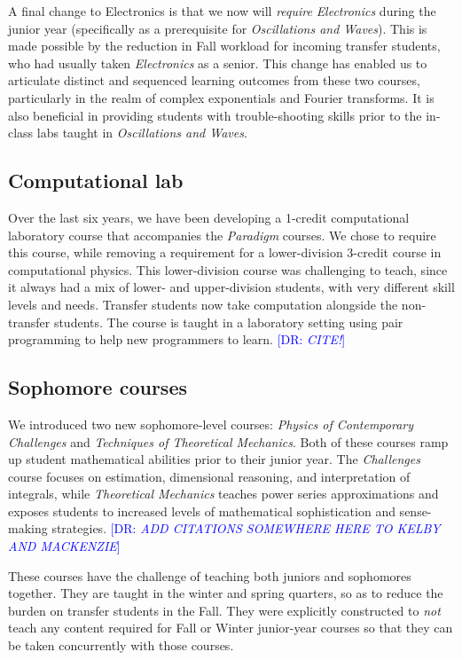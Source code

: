 \documentclass[english,aps,pra,reprint,noshowpacs,superscriptaddress]{revtex4-1}
\newcommand\davidsays[1]{\textcolor{blue}{[\sc DR: {\em#1}]}}
\begin{document}
A final change to Electronics is that we now will \emph{require}
\emph{Electronics} during the junior year (specifically as a prerequisite for
\emph{Oscillations and Waves}).  This is made possible by the reduction in
Fall workload for incoming transfer students, who had
usually taken \emph{Electronics} as a senior.  This change has enabled us to
articulate distinct and sequenced learning outcomes from these two
courses, particularly in the realm of complex exponentials and Fourier
transforms.  It is also beneficial in providing students with
trouble-shooting skills prior to the in-class labs taught in
\emph{Oscillations and Waves}.

\subsection{Computational lab}
Over the last six years, we have been developing a 1-credit
computational laboratory course that accompanies the \emph{Paradigm} courses.  We
chose to require this course, while removing a requirement for a
lower-division 3-credit course in computational physics.  This
lower-division course was challenging to teach, since it always had a
mix of lower- and upper-division students, with very different skill
levels and needs.  Transfer students now take computation alongside
the non-transfer students. The course is taught in a laboratory setting using pair
programming to help new programmers to learn. \davidsays{CITE!}

\subsection{Sophomore courses}
We introduced two new sophomore-level courses: \emph{Physics of
Contemporary Challenges} and \emph{Techniques of Theoretical Mechanics}.  Both of
these courses ramp up student mathematical abilities prior to their
junior year.  The \emph{Challenges} course focuses on estimation,
dimensional reasoning, and interpretation of integrals, while
\emph{Theoretical Mechanics} teaches power series approximations and
exposes students to increased levels of mathematical sophistication and
sense-making strategies. \davidsays{ADD CITATIONS SOMEWHERE HERE TO KELBY AND MACKENZIE}

These courses have the challenge of teaching both juniors and sophomores
together.  They are taught in the winter and spring quarters, so
as to reduce the burden on transfer students in the Fall.  They were
explicitly constructed to \emph{not} teach any content required for
Fall or Winter junior-year courses so that they can be taken concurrently with
those courses.
\end{document}
